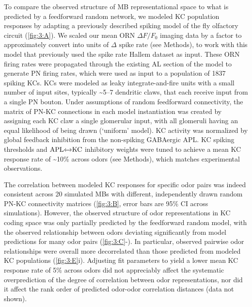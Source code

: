 \documentclass[12pt]{caltech_thesis}
\renewcommand{\cite}{{ }\autocite}
\newcommand{\DeltaFOverF}{\ensuremath{\Delta\text{$F$/$F_0$}}}
\newcommand{\APLKC}{\ensuremath{\text{APL}{\xleftrightarrow{}}\text{KC }}}
\begin{document}
\begin{refsection}
To compare the observed structure of MB representational space to what is predicted by a feedforward random network, we modeled KC population responses by adapting a previously described spiking model of the fly olfactory circuit\cite{Kennedy2019} (\cref{fig:3:A}).
We scaled our mean ORN \DeltaFOverF{ }imaging data by a factor to approximately convert into units of $\Delta\text{ spike rate}$ (see Methods), to work with this model that previously used the spike rate Hallem dataset\cite{Hallem2006} as input.
These ORN firing rates were propagated through the existing AL section of the model to generate PN firing rates, which were used as input to a population of \num{1837} spiking KCs.
KCs were modeled as leaky integrate-and-fire units with a small number of input sites, typically \textasciitilde\numrange{5}{7} dendritic claws, that each receive input from a single PN bouton.
Under assumptions of random feedforward connectivity, the matrix of PN-KC connections in each model instantiation was created by assigning each KC claw a single glomerular input, with all glomeruli having an equal likelihood of being drawn (`uniform' model).
KC activity was normalized by global feedback inhibition from the non-spiking GABAergic APL.
KC spiking thresholds and \APLKC inhibitory weights were tuned to achieve a mean KC response rate of \textasciitilde10\% across odors (see Methods), which matches experimental observations.

The correlation between modeled KC responses for specific odor pairs was indeed consistent across 20 simulated MBs with different, independently drawn random PN-KC connectivity matrices (\cref{fig:3:B}, error bars are 95\% CI across simulations).
However, the observed structure of odor representations in KC coding space was only partially predicted by the feedforward random model, with the observed relationship between odors deviating significantly from model predictions for many odor pairs (\cref{fig:3:C}-).
In particular, observed pairwise odor relationships were overall more decorrelated than those predicted from modeled KC populations (\cref{fig:3:E}i).
Adjusting fit parameters to yield a lower mean KC response rate of 5\% across odors did not appreciably affect the systematic overprediction of the degree of correlation between odor representations, nor did it affect the rank order of predicted odor-odor correlation distances (data not shown).


\end{refsection}
\end{document}
